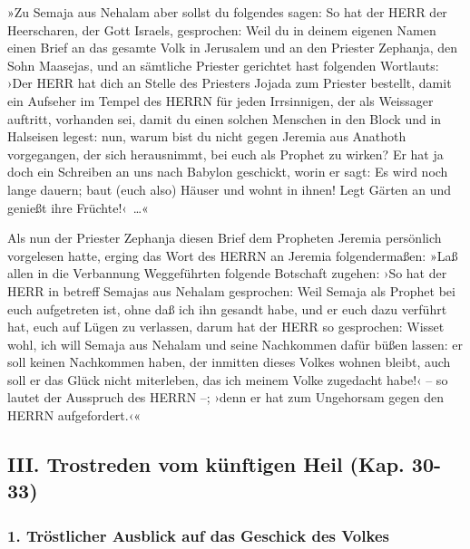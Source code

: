 »Zu Semaja aus Nehalam aber sollst du folgendes sagen:
So hat der HERR der Heerscharen, der Gott Israels,
gesprochen: Weil du in deinem eigenen Namen einen Brief an das gesamte
Volk in Jerusalem und an den Priester Zephanja, den Sohn Maasejas, und
an sämtliche Priester gerichtet hast folgenden Wortlauts:
›Der HERR hat dich an Stelle des Priesters Jojada zum
Priester bestellt, damit ein Aufseher im Tempel des HERRN für jeden
Irrsinnigen, der als Weissager auftritt, vorhanden sei, damit du einen
solchen Menschen in den Block und in Halseisen legest:
nun, warum bist du nicht gegen Jeremia aus Anathoth
vorgegangen, der sich herausnimmt, bei euch als Prophet zu wirken?
Er hat ja doch ein Schreiben an uns nach Babylon
geschickt, worin er sagt: Es wird noch lange dauern; baut (euch also)
Häuser und wohnt in ihnen! Legt Gärten an und genießt ihre
Früchte!‹~\ldots«

Als nun der Priester Zephanja diesen Brief dem Propheten
Jeremia persönlich vorgelesen hatte, erging das Wort des
HERRN an Jeremia folgendermaßen: »Laß allen in die
Verbannung Weggeführten folgende Botschaft zugehen: ›So hat der HERR in
betreff Semajas aus Nehalam gesprochen: Weil Semaja als Prophet bei euch
aufgetreten ist, ohne daß ich ihn gesandt habe, und er euch dazu
verführt hat, euch auf Lügen zu verlassen, darum hat der
HERR so gesprochen: Wisset wohl, ich will Semaja aus Nehalam und seine
Nachkommen dafür büßen lassen: er soll keinen Nachkommen haben, der
inmitten dieses Volkes wohnen bleibt, auch soll er das Glück nicht
miterleben, das ich meinem Volke zugedacht habe!‹ -- so lautet der
Ausspruch des HERRN --; ›denn er hat zum Ungehorsam gegen den HERRN
aufgefordert.‹«

\hypertarget{iii.-trostreden-vom-kuxfcnftigen-heil-kap.-30-33}{%
\subsection{III. Trostreden vom künftigen Heil (Kap.
30-33)}\label{iii.-trostreden-vom-kuxfcnftigen-heil-kap.-30-33}}

\hypertarget{truxf6stlicher-ausblick-auf-das-geschick-des-volkes}{%
\subsubsection{1. Tröstlicher Ausblick auf das Geschick des
Volkes}\label{truxf6stlicher-ausblick-auf-das-geschick-des-volkes}}

